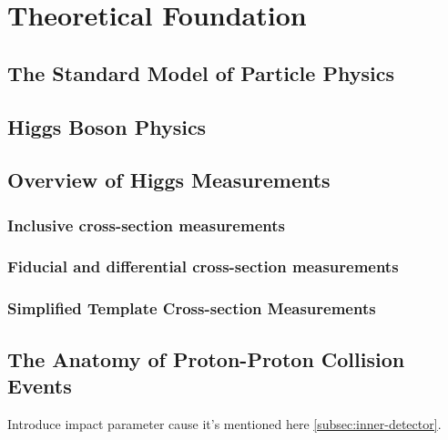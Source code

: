 \chapter{Theoretical Foundation}
\label{chap:theory}

\section{The Standard Model of Particle Physics}

\section{Higgs Boson Physics}

\section{Overview of Higgs Measurements}
\subsection{Inclusive cross-section measurements}
\subsection{Fiducial and differential cross-section measurements}
\subsection{Simplified Template Cross-section Measurements}

\section{The Anatomy of Proton-Proton Collision Events}
\label{sec:anatomy}
Introduce impact parameter cause it's mentioned here \cref{subsec:inner-detector}.



